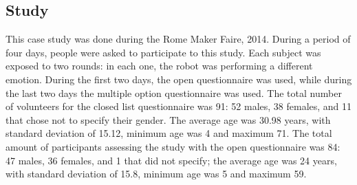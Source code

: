 \subsection{Study}
This case study was done during the Rome Maker Faire, 2014. During a period of four days, people were asked to participate to this study. Each subject was exposed to two rounds: in each one, the robot was performing a different emotion. During the first two days, the open questionnaire was used, while during the last two days the multiple option questionnaire was used. The total number of volunteers for the closed list questionnaire was 91: 52 males, 38 females, and 11 that chose not to specify their gender. The average age was 30.98 years, with standard deviation of 15.12, minimum age was 4 and maximum 71. The total amount of participants assessing the study with the open questionnaire was 84: 47 males, 36 females, and 1 that did not specify; the average age was 24 years, with standard deviation of 15.8, minimum age was 5 and maximum 59. 
